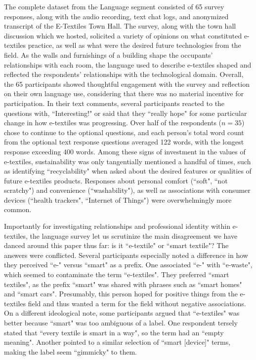 The complete dataset from the Language segment consisted of 65 survey responses, along with the audio recording, text chat logs, and anonymized transcript of the E-Textiles Town Hall. 
The survey, along with the town hall discussion which we hosted, solicited a variety of opinions on what constituted e-textiles practice, as well as what were the desired future technologies from the field. As the walls and furnishings of a building shape the occupants' relationships with each room, the language used to describe e-textiles shaped and reflected the respondents' relationships with the technological domain.
Overall, the 65 participants showed thoughtful engagement with the survey and reflection on their own language use, considering that there was no material incentive for participation. In their text comments, several participants reacted to the questions with, ``Interesting!" or said that they ``really hope" for some particular change in how e-textiles was progressing. 
Over half of the respondents ($n=35$) chose to continue to the optional questions, and each person's total word count from the optional text response questions averaged 122 words, with the longest response exceeding 400 words. 
Among these signs of investment in the values of e-textiles, sustainability was only tangentially mentioned a handful of times, such as identifying ``recyclability" when asked about the desired features or qualities of future e-textiles products. Responses about personal comfort (``soft", ``not scratchy") and convenience (``washability"), as well as associations with consumer devices (``health trackers", ``Internet of Things") were overwhelmingly more common.

Importantly for investigating relationships and professional identity within e-textiles, the language survey let us scrutinize the main disagreement we have danced around this paper thus far: is it ``e-textile" or ``smart textile"? The answers were conflicted. Several participants especially noted a difference in how they perceived ``e-" versus ``smart" as a prefix. One associated ``e-" with ``e-waste", which seemed to contaminate the term ``e-textiles". They preferred ``smart textiles", as the prefix ``smart" was shared with phrases such as ``smart homes" and ``smart cars". Presumably, this person hoped for positive things from the e-textiles field and thus wanted a term for the field without negative associations. On a different ideological note, some participants argued that ``e-textiles" was better because ``smart" was too ambiguous of a label. One respondent tersely stated that ``every textile is smart in a way", so the term had an ``empty meaning". Another pointed to a similar selection of ``smart [device]" terms, making the label seem ``gimmicky" to them. 

